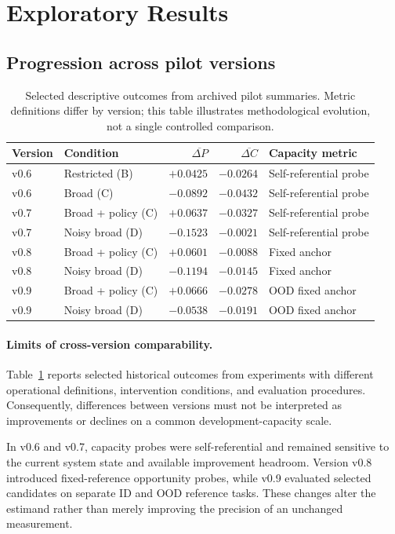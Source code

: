 \documentclass[11pt,a4paper]{article}
\begin{document}
\section{Exploratory Results}
\subsection{Progression across pilot versions}
\begin{table}[htbp]\centering\small
\begin{tabular}{@{}llrrl@{}}\toprule
Version & Condition & $\overline{\Delta P}$ & $\overline{\Delta C}$ & Capacity metric \\\midrule
v0.6 & Restricted (B) & $+0.0425$ & $-0.0264$ & Self-referential probe \\
v0.6 & Broad (C) & $-0.0892$ & $-0.0432$ & Self-referential probe \\
v0.7 & Broad + policy (C) & $+0.0637$ & $-0.0327$ & Self-referential probe \\
v0.7 & Noisy broad (D) & $-0.1523$ & $-0.0021$ & Self-referential probe \\
v0.8 & Broad + policy (C) & $+0.0601$ & $-0.0088$ & Fixed anchor \\
v0.8 & Noisy broad (D) & $-0.1194$ & $-0.0145$ & Fixed anchor \\
v0.9 & Broad + policy (C) & $+0.0666$ & $-0.0278$ & OOD fixed anchor \\
v0.9 & Noisy broad (D) & $-0.0538$ & $-0.0191$ & OOD fixed anchor \\\bottomrule
\end{tabular}\caption{Selected descriptive outcomes from archived pilot summaries. Metric definitions differ by version; this table illustrates methodological evolution, not a single controlled comparison.}\label{tab:progression}
\end{table}

\paragraph{Limits of cross-version comparability.}

Table~\ref{tab:progression} reports selected historical outcomes from experiments with different operational definitions, intervention conditions, and evaluation procedures. Consequently, differences between versions must not be interpreted as improvements or declines on a common development-capacity
scale.

In v0.6 and v0.7, capacity probes were self-referential and remained sensitive to the current system state and available improvement headroom. Version v0.8 introduced fixed-reference opportunity probes, while v0.9 evaluated selected candidates on separate ID and OOD reference tasks. These changes alter
the estimand rather than merely improving the precision of an unchanged measurement.
\end{document}
